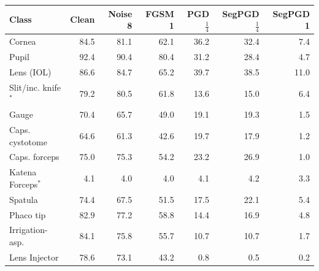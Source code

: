 \begin{tabular}{@{}lrrrrrr@{}}
\toprule
Class & Clean & Noise 8 & FGSM 1 & PGD $\frac{1}{4}$ & SegPGD $\frac{1}{4}$ & SegPGD 1 \\
\midrule
Cornea & 84.5 & 81.1 & 62.1 & 36.2 & 32.4 & 7.4 \\
Pupil & 92.4 & 90.4 & 80.4 & 31.2 & 28.4 & 4.7 \\
Lens (IOL) & 86.6 & 84.7 & 65.2 & 39.7 & 38.5 & 11.0 \\
\addlinespace[2pt]
Slit/inc. knife$^\ast$ & 79.2 & 80.5 & 61.8 & 13.6 & 15.0 & 6.4 \\
Gauge & 70.4 & 65.7 & 49.0 & 19.1 & 19.3 & 1.5 \\
Caps. cystotome & 64.6 & 61.3 & 42.6 & 19.7 & 17.9 & 1.2 \\
Caps. forceps & 75.0 & 75.3 & 54.2 & 23.2 & 26.9 & 1.0 \\
Katena Forceps$^\ast$ & 4.1 & 4.0 & 4.0 & 4.1 & 4.2 & 3.3 \\
Spatula & 74.4 & 67.5 & 51.5 & 17.5 & 22.1 & 5.4 \\
Phaco tip & 82.9 & 77.2 & 58.8 & 14.4 & 16.9 & 4.8 \\
Irrigation-asp. & 84.1 & 75.8 & 55.7 & 10.7 & 10.7 & 1.7 \\
Lens Injector & 78.6 & 73.1 & 43.2 & 0.8 & 0.5 & 0.2 \\
\bottomrule
\end{tabular}
